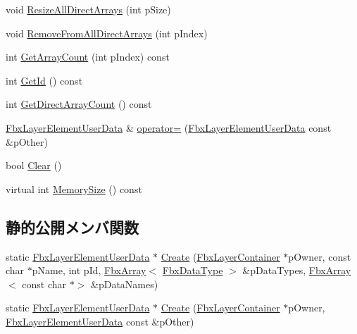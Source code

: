 \begin{DoxyCompactItemize}
\item 
void \hyperlink{class_fbx_layer_element_user_data_a8d6ab3a926c28cc793dbfabde35ab598}{Resize\+All\+Direct\+Arrays} (int p\+Size)
\item 
void \hyperlink{class_fbx_layer_element_user_data_a2a086bdb717ea023b9bfb6cab66f23d4}{Remove\+From\+All\+Direct\+Arrays} (int p\+Index)
\item 
int \hyperlink{class_fbx_layer_element_user_data_a6b36419283440b8f63c5af36ffb27d3a}{Get\+Array\+Count} (int p\+Index) const
\item 
int \hyperlink{class_fbx_layer_element_user_data_a6a7133826a8e21dc296e44109902e717}{Get\+Id} () const
\item 
int \hyperlink{class_fbx_layer_element_user_data_a5f7f18cd0b66e1868f9307129f45f51d}{Get\+Direct\+Array\+Count} () const
\item 
\hyperlink{class_fbx_layer_element_user_data}{Fbx\+Layer\+Element\+User\+Data} \& \hyperlink{class_fbx_layer_element_user_data_ae4e7b6fca22ea7dc404251bfea061e8d}{operator=} (\hyperlink{class_fbx_layer_element_user_data}{Fbx\+Layer\+Element\+User\+Data} const \&p\+Other)
\item 
bool \hyperlink{class_fbx_layer_element_user_data_aa945631c932f3c811013c903e5ecf55e}{Clear} ()
\item 
virtual int \hyperlink{class_fbx_layer_element_user_data_aa02fc5861dec4da68293f9660d4ff13b}{Memory\+Size} () const
\end{DoxyCompactItemize}
\subsection*{静的公開メンバ関数}
\begin{DoxyCompactItemize}
\item 
static \hyperlink{class_fbx_layer_element_user_data}{Fbx\+Layer\+Element\+User\+Data} $\ast$ \hyperlink{class_fbx_layer_element_user_data_ab0a2546165cae14c62143352a32c5dbc}{Create} (\hyperlink{class_fbx_layer_container}{Fbx\+Layer\+Container} $\ast$p\+Owner, const char $\ast$p\+Name, int p\+Id, \hyperlink{class_fbx_array}{Fbx\+Array}$<$ \hyperlink{class_fbx_data_type}{Fbx\+Data\+Type} $>$ \&p\+Data\+Types, \hyperlink{class_fbx_array}{Fbx\+Array}$<$ const char $\ast$$>$ \&p\+Data\+Names)
\item 
static \hyperlink{class_fbx_layer_element_user_data}{Fbx\+Layer\+Element\+User\+Data} $\ast$ \hyperlink{class_fbx_layer_element_user_data_a9088500171dca2a09a3f1b87dea28975}{Create} (\hyperlink{class_fbx_layer_container}{Fbx\+Layer\+Container} $\ast$p\+Owner, \hyperlink{class_fbx_layer_element_user_data}{Fbx\+Layer\+Element\+User\+Data} const \&p\+Other)
\end{DoxyCompactItemize}
